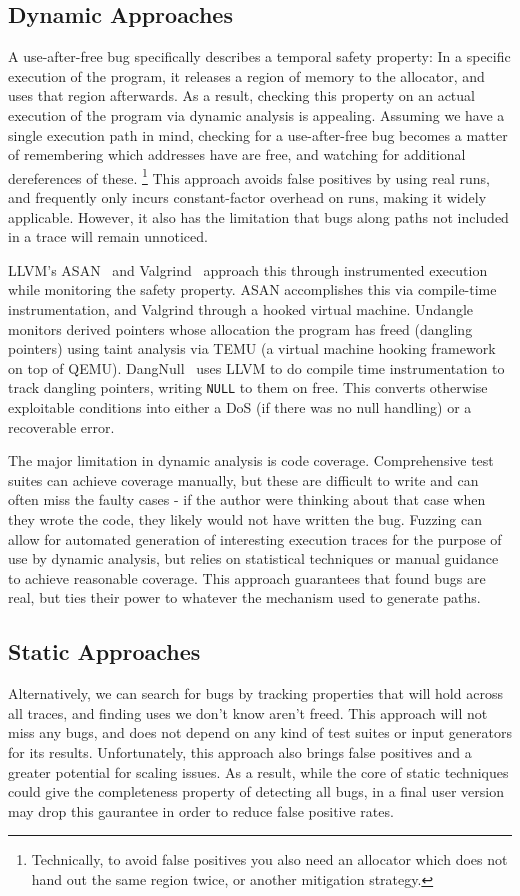 \subsection{Dynamic Approaches}
A use-after-free bug specifically describes a temporal safety property:
In a specific execution of the program, it releases a region of memory to the allocator, and uses that region afterwards.
As a result, checking this property on an actual execution of the program via dynamic analysis is appealing.
Assuming we have a single execution path in mind, checking for a use-after-free bug becomes a matter of remembering which addresses have are free, and watching for additional dereferences of these.
\footnote{Technically, to avoid false positives you also need an allocator which does not hand out the same region twice, or another mitigation strategy.}
This approach avoids false positives by using real runs, and frequently only incurs constant-factor overhead on runs, making it widely applicable.
However, it also has the limitation that bugs along paths not included in a trace will remain unnoticed.

LLVM's ASAN~\cite{asan} and Valgrind~\cite{valgrind} approach this through instrumented execution while monitoring the safety property.
ASAN accomplishes this via compile-time instrumentation, and Valgrind through a hooked virtual machine.
Undangle~\cite{undangle} monitors derived pointers whose allocation the program has freed (dangling pointers) using taint analysis via TEMU (a virtual machine hooking framework on top of QEMU).
DangNull~\cite{dangnull} uses LLVM to do compile time instrumentation to track dangling pointers, writing \texttt{NULL} to them on free.
This converts otherwise exploitable conditions into either a DoS (if there was no null handling) or a recoverable error.

The major limitation in dynamic analysis is code coverage.
Comprehensive test suites can achieve coverage manually, but these are difficult to write and can often miss the faulty cases - if the author were thinking about that case when they wrote the code, they likely would not have written the bug.
Fuzzing can allow for automated generation of interesting execution traces for the purpose of use by dynamic analysis, but relies on statistical techniques or manual guidance to achieve reasonable coverage.
This approach guarantees that found bugs are real, but ties their power to whatever the mechanism used to generate paths.

\subsection{Static Approaches}
Alternatively, we can search for bugs by tracking properties that will hold across all traces, and finding uses we don't know aren't freed.
This approach will not miss any bugs, and does not depend on any kind of test suites or input generators for its results.
Unfortunately, this approach also brings false positives and a greater potential for scaling issues.
As a result, while the core of static techniques could give the completeness property of detecting all bugs, in a final user version may drop this gaurantee in order to reduce false positive rates.

